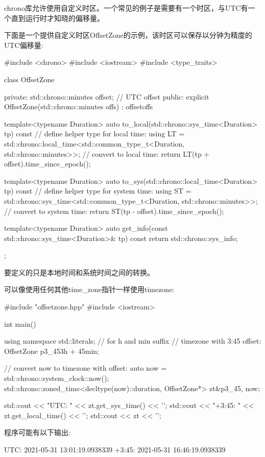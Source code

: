 chrono库允许使用自定义时区。一个常见的例子是需要有一个时区，与UTC有一个直到运行时才知晓的偏移量。

下面是一个提供自定义时区OffsetZone的示例，该时区可以保存以分钟为精度的UTC偏移量:


\begin{cpp}
#include <chrono>
#include <iostream>
#include <type_traits>

class OffsetZone
{
	private:
	std::chrono::minutes offset; // UTC offset
	public:
	explicit OffsetZone(std::chrono::minutes offs)
	: offset{offs} {
	}

	template<typename Duration>
	auto to_local(std::chrono::sys_time<Duration> tp) const {
		// define helper type for local time:
		using LT
		= std::chrono::local_time<std::common_type_t<Duration,
													std::chrono::minutes>>;
		// convert to local time:
		return LT{(tp + offset).time_since_epoch()};
	}

	template<typename Duration>
	auto to_sys(std::chrono::local_time<Duration> tp) const {
		// define helper type for system time:
		using ST
		= std::chrono::sys_time<std::common_type_t<Duration,
													std::chrono::minutes>>;
		// convert to system time:
		return ST{(tp - offset).time_since_epoch()};
	}

	template<typename Duration>
	auto get_info(const std::chrono::sys_time<Duration>& tp) const {
		return std::chrono::sys_info{};
	}
};
\end{cpp}

要定义的只是本地时间和系统时间之间的转换。

可以像使用任何其他time\_zone指针一样使用timezone:


\begin{cpp}
#include "offsetzone.hpp"
#include <iostream>

int main()
{
	using namespace std::literals; // for h and min suffix
	// timezone with 3:45 offset:
	OffsetZone p3_45{3h + 45min};

	// convert now to timezone with offset:
	auto now = std::chrono::system_clock::now();
	std::chrono::zoned_time<decltype(now)::duration, OffsetZone*> zt{&p3_45, now};

	std::cout << "UTC: " << zt.get_sys_time() << '\n';
	std::cout << "+3:45: " << zt.get_local_time() << '\n';
	std::cout << zt << '\n';
}
\end{cpp}

程序可能有以下输出:

\begin{shell}
UTC:    2021-05-31 13:01:19.0938339
+3:45:  2021-05-31 16:46:19.0938339
\end{shell}










